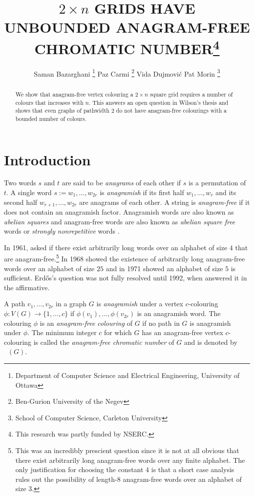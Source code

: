 \documentclass{patmorin}
\title{\MakeUppercase{$2\times n$ Grids have Unbounded Anagram-Free Chromatic Number}\thanks{This research was partly funded by NSERC.}}
\author{Saman Bazarghani%
    \thanks{Department of Computer Science and Electrical Engineering, University of Ottawa}\qquad
    Paz Carmi%
    \thanks{Ben-Gurion University of the Negev}\qquad
    Vida Dujmović\footnotemark[2]\qquad
    Pat Morin%
    \thanks{School of Computer Science, Carleton University}}
\date{}
\DeclareMathOperator{\afcn}{\dot{\chi}_\pi}
\begin{document}
\maketitle

\begin{abstract}
    We show that anagram-free vertex colouring a $2\times n$ square grid requires a number of colours that increases with $n$.  This answers an open question in Wilson's thesis and shows that even graphs of pathwidth $2$ do not have anagram-free colourings with a bounded number of colours.
\end{abstract}

%



\section{Introduction}

Two words $s$ and $t$ are said to be \emph{anagrams} of each other if $s$ is a permutation of $t$.  A single word $s:=w_1,\ldots,w_{2r}$ is \emph{anagramish} if its first half $w_1,\ldots,w_r$ and its second half $w_{r+1},\ldots,w_{2r}$ are anagrams of each other.  A string is \emph{anagram-free} if it does not contain an anagramish factor.  Anagramish words are also known as \emph{abelian squares} and anagram-free words are also known as \emph{abelian square free} words or \emph{strongly nonrepetitive} words \cite{X,Y,Z}.

In 1961, \citet{erdos:some} asked if there exist arbitrarily long words over an alphabet of size $4$ that are anagram-free.\footnote{This was an incredibly prescient question since it is not at all obvious that there exist arbitrarily long anagram-free words over any finite alphabet. The only justification for choosing the constant $4$ is that a short case analysis rules out the possibility of length-$8$ anagram-free words over an alphabet of size $3$.}  In 1968 \citet{evdokimov:strongly,evdokimov:strongly2} showed the existence of arbitrarily long anagram-free words over an alphabet of size $25$ and in 1971 \citet{pleasants:non-repetitive} showed an alphabet of size $5$ is sufficient.  Erd\H{o}s's question was not fully resolved until 1992, when \citet{keranen:abelian} answered it in the affirmative.

A path $v_1,\ldots,v_{2r}$ in a graph $G$ is \emph{anagramish} under a vertex $c$-colouring $\phi:V(G)\to\{1,\ldots,c\}$ if $\phi(v_1),\ldots,\phi(v_{2r})$ is an anagramish word.  The colouring $\phi$ is an \emph{anagram-free colouring} of $G$ if no path in $G$ is anagramish under $\phi$.  The minimum integer $c$ for which $G$ has an anagram-free vertex $c$-colouring is called the \emph{anagram-free chromatic number} of $G$ and is denoted by $\afcn(G)$.
\end{document}
